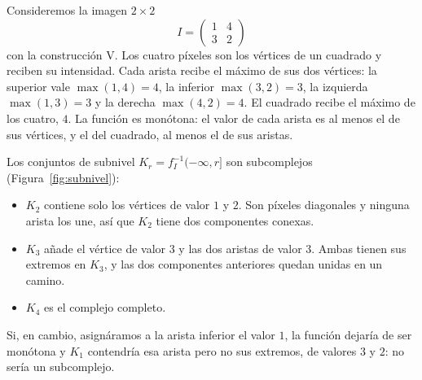 \begin{ejemplo}
Consideremos la imagen $2\times2$
\[
  I=\begin{pmatrix}1&4\\3&2\end{pmatrix}
\]
con la construcción V. Los cuatro píxeles son los vértices de un cuadrado y
reciben su intensidad. Cada arista recibe el máximo de sus dos vértices:
la superior vale $\max(1,4)=4$, la inferior $\max(3,2)=3$, la izquierda
$\max(1,3)=3$ y la derecha $\max(4,2)=4$. El cuadrado recibe el máximo de
los cuatro, $4$. La función es monótona: el valor de cada arista es al
menos el de sus vértices, y el del cuadrado, al menos el de sus aristas.

Los conjuntos de subnivel $K_r=f_I^{-1}(-\infty,r]$ son subcomplejos
(Figura~\ref{fig:subnivel}):
\begin{itemize}
  \item $K_2$ contiene solo los vértices de valor $1$ y $2$. Son píxeles
  diagonales y ninguna arista los une, así que $K_2$ tiene dos
  componentes conexas.
  \item $K_3$ añade el vértice de valor $3$ y las dos aristas de valor
  $3$. Ambas tienen sus extremos en $K_3$, y las dos componentes
  anteriores quedan unidas en un camino.
  \item $K_4$ es el complejo completo.
\end{itemize}
Si, en cambio, asignáramos a la arista inferior el valor $1$, la función
dejaría de ser monótona y $K_1$ contendría esa arista pero no sus
extremos, de valores $3$ y $2$: no sería un subcomplejo.
\end{ejemplo}

